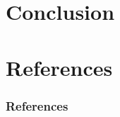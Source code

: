\documentclass[11pt, aspectratio=1610, xcolor={dvipsnames}]{beamer}
\begin{document}
	\section{Conclusion}
	\begin{frame}
		\frametitle{}
	\end{frame}
	
	\section*{References}
	\begin{frame}[allowframebreaks]
		\frametitle{References}
		
		
		
	\end{frame}
	
\end{document}
